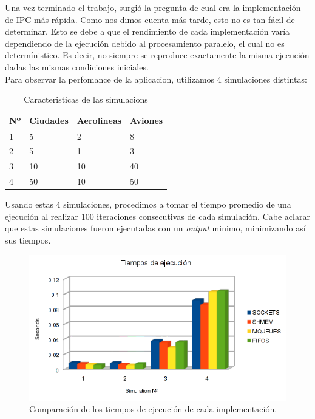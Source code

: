\documentclass[a4paper,10pt]{article}
\begin{document}
Una vez terminado el trabajo, surgió la pregunta de cual era la implementación de IPC más rápida. Como nos dimos cuenta más tarde, esto no es tan fácil de determinar. 
Esto se debe a que el rendimiento de cada implementación varía dependiendo de la ejecución debido al procesamiento paralelo, el cual no es determínistico. 
Es decir, no siempre se reproduce exactamente la misma ejecución dadas las mismas condiciones iniciales. \\

Para observar la perfomance de la aplicacion, utilizamos 4 simulaciones distintas:

\begin{table}[H]
\begin{center}
\begin{tabular}{l|l|l|l}
Nº & Ciudades & Aerolineas & Aviones \\
\hline
1 & 5 & 2 & 8 \\
2 & 5 & 1 & 3 \\
3 & 10 & 10 & 40 \\
4 & 50 & 10 & 50 \\
\end{tabular}
\caption{Caracteristicas de las simulacions}
\end{center}
\end{table}

Usando estas 4 simulaciones, procedimos a tomar el tiempo promedio de una ejecución al realizar 100 iteraciones consecutivas de cada simulación.
Cabe aclarar que estas simulaciones fueron ejecutadas con un \textit{output} minimo, minimizando así sus tiempos.

\begin{figure}[H]
\begin{center}
 \includegraphics[scale=0.75]{./images/runningTimesChart.png}
  \caption{Comparación de los tiempos de ejecución de cada implementación.}
\end{center}
\end{figure}
\end{document}
